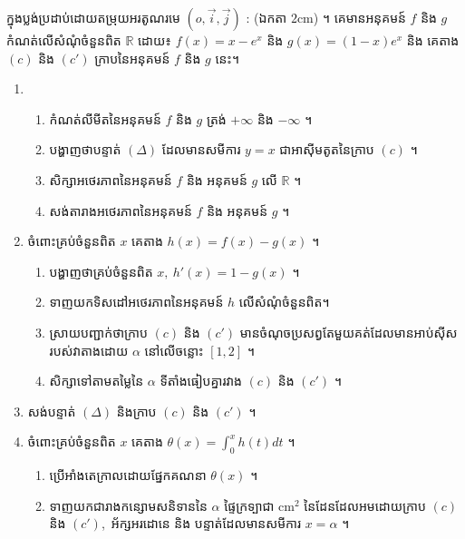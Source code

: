 \documentclass{officialexam}
\begin{document}
\newpage 
ក្នុងប្លង់ប្រដាប់ដោយតម្រុយអរតូណរមេ $\left(o,\overrightarrow{i},\overrightarrow{j}\right)$ : (ឯកតា $2\mathrm{cm}$) ។
		គេមានអនុគមន៍ $f$ និង $g$ កំណត់លើសំណុំចំនួនពិត $\mathbb{R}$  ដោយ៖
$f(x)=x-e^x$ និង  $g(x)=(1-x)e^x$ និង គេតាង $(c)$  និង $\left(c'\right)$  ក្រាបនៃអនុគមន៍  $f$ និង $g$ 		នេះ។
		\begin{enumerate}[k]
		\item \begin{enumerate}[a]
					\item  កំណត់លីមីតនៃអនុគមន៍ $f$ និង $g$  ត្រង់ $+\infty$  និង $-\infty$  ។
					\item បង្ហាញថាបន្ទាត់ $(\Delta)$ ដែលមានសមីការ $y=x$  ជាអាស៊ីមតូតនៃក្រាប $(c)$  ។
					\item សិក្សាអថេរភាពនៃអនុគមន៍ $f$ និង អនុគមន៍ $g$ លើ $\mathbb{R}$ ។
					\item សង់តារាងអថេរភាពនៃអនុគមន៍ $f$ និង អនុគមន៍ $g$ ។
		\end{enumerate}
	\item ចំពោះគ្រប់ចំនួនពិត $x$ គេតាង $h(x)=f(x)-g(x)$  ។
			\begin{enumerate}[a]
			\item បង្ហាញថាគ្រប់ចំនួនពិត $x,\ h'(x)=1-g(x)$ ។
			\item ទាញយកទិសដៅអថេរភាពនៃអនុគមន៍  $h$ លើសំណុំចំនួនពិត។
			\item ស្រាយបញ្ជាក់ថាក្រាប $(c)$ និង $(c')$ មានចំណុចប្រសព្វតែមួយគត់ដែលមានអាប់ស៊ីសរបស់វាតាងដោយ $\alpha$ នៅលើចន្លោះ $[1,2]$ ។  
			\item សិក្សាទៅតាមតម្លៃនៃ $\alpha$  ទីតាំងធៀបគ្នារវាង $(c)$ និង $(c')$ ។
			\end{enumerate}
\item សង់បន្ទាត់ $(\Delta)$ និងក្រាប $(c)$ និង $(c')$ ។
\item ចំពោះគ្រប់ចំនួនពិត $x$ គេតាង $\theta  (x)=\int_0^xh(t)dt$ ។ 
		\begin{enumerate}[a]
		\item ប្រើអាំងតេក្រាលដោយផ្នែកគណនា $\theta (x)$ ។
		\item ទាញយកជារាងកន្សោមសនិទាននៃ  $\alpha$ ផ្ទៃក្រទ្បាជា $\mathrm{cm^2}$  នៃដែនដែលអមដោយក្រាប $(c)$ និង $(c')$,\ អ័ក្សអរដោនេ និង បន្ទាត់ដែលមានសមីការ $x=\alpha$ ។
		\end{enumerate}
\end{enumerate}	


           
\end{document}
